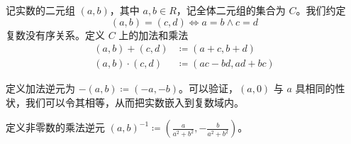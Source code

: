 记实数的二元组 $(a,b)$，其中 $a,b\in R$，记全体二元组的集合为 $C$。我们约定
\[(a,b) = (c,d) \Leftrightarrow a=b \land  c=d\]
复数没有序关系。定义 $C$ 上的加法和乘法
\[\begin{aligned}
		(a,b) + (c,d) &\coloneqq  (a+c,b+d)\\
		(a,b) \cdot (c,d) &\coloneqq  (ac-bd,ad+bc)
\end{aligned}\]

定义加法逆元为 $-(a,b) \coloneqq  (-a,-b)$。可以验证，$(a,0)$ 与 $a$ 具相同的性状，我们可以令其相等，从而把实数嵌入到复数域内。

定义非零数的乘法逆元 $(a,b)^{-1} \coloneqq  \left(\frac{a}{a^2+b^2},-\frac{b}{a^2+b^2}\right)$。









